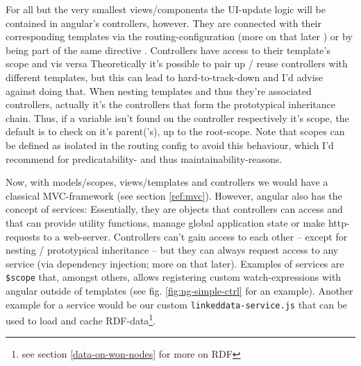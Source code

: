 For all but the very smallest views/components the UI-update logic will be contained in angular's controllers, however. They are connected with their corresponding templates via the routing-configuration (more on that later ) or by being part of the same directive . Controllers have access to their template's scope and vis versa %
Theoretically it's possible to pair up / reuse controllers with different templates, but this can lead to hard-to-track-down and I'd advise against doing that.
When nesting templates and thus they're associated controllers, actually it's the controllers that form the prototypical inheritance chain. Thus, if a variable isn't found on the controller respectively it's scope, the default is to check on it's parent('s), up to the root-scope. Note that scopes can be defined as isolated in the routing config  to avoid this behaviour, which I'd recommend for predicatability- and thus maintainability-reasons.

Now, with models/scopes, views/templates and controllers we would have a classical MVC-framework (see section \ref{ref:mvc}). However, angular also has the concept of services: Essentially, they are objects that controllers can access and that can provide utility functions, manage global application state or make http-requests to a web-server. Controllers can't gain access to each other -- except for nesting / prototypical inheritance -- but they can always request access to any service (via dependency injection; more on
that later). Examples of services are \texttt{\$scope} that, amongst others, allows registering custom watch-expressions with angular outside of templates (see fig. \ref{fig:ng-simple-ctrl} for an example). Another example for a service would be our custom \texttt{linkeddata-service.js} that can be used to load and cache RDF-data\footnote{see section \ref{data-on-won-nodes} for more on RDF}.


